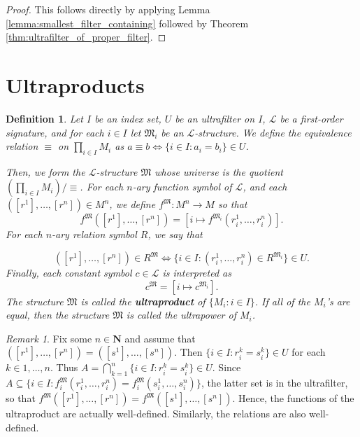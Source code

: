 \documentclass[leqno]{article}
\newtheorem{definition}{Definition}[section]
\theoremstyle{remark}
\newtheorem{remark}{Remark}[section]
\newcommand{\N}{\mathbf{N}}
\newcommand{\paren}[1]{\left( #1 \right)}
\newcommand{\set}[1]{\{#1\}}
\newcommand{\lang}{\mathcal{L}}
\newcommand{\struct}[1]{\mathfrak{#1}}
\begin{document}
\begin{proof}
    This follows directly by applying Lemma \ref{lemma:smallest_filter_containing} followed by Theorem \ref{thm:ultrafilter_of_proper_filter}.
\end{proof}


\section{Ultraproducts}

\begin{definition}
    Let $I$ be an index set, $U$ be an ultrafilter on $I$, $\lang$ be a first-order signature, and for each $i \in I$ let $\struct{M}_i$ be an $\lang$-structure. We define the equivalence relation $\equiv$ on $\prod_{i \in I} M_i$ as $a \equiv b \iff \set{i \in I : a_i = b_i} \in U$.
    
    Then, we form the $\lang$-structure $\struct{M}$ whose universe is the quotient $\paren{\prod_{i \in I} M_i} / \equiv$. For each $n$-ary function symbol of $\lang$, and each $([r^1], \dots, [r^n]) \in M^n$, we define $f^\struct{M} : M^n \to M$ so that
    $$f^\struct{M}([r^1], \dots, [r^n]) = [i \mapsto f^{\struct{M}_i}(r^{1}_i, \dots, r^{n}_i)].$$ For each $n$-ary relation symbol $R$, we say that 
    
    \begin{equation*}
        ([r^1], \dots, [r^n]) \in R^\struct{M} \iff \set{i \in I : (r^1_i, \dots, r^n_i) \in R^{\struct{M}_i}} \in U.
    \end{equation*} Finally, each constant symbol $c \in \lang$ is interpreted as \begin{equation*}
        c^\struct{M} = [i \mapsto c^{\struct{M}_i}].
    \end{equation*} The structure $\struct{M}$ is called the \textbf{ultraproduct} of $\set{M_i : i \in I}$. If all of the $M_i$'s are equal, then the structure $\struct{M}$ is called the ultrapower of $M_i$.
\end{definition}

\begin{remark}
    Fix some $n \in \N$ and assume that $([r^1], \dots, [r^n]) = ([s^1], \dots, [s^n])$. Then $\set{i \in I : r^k_i = s^k_i} \in U$ for each $k \in 1, \dots, n$. Thus $A = \bigcap_{k = 1}^n \set{i \in I : r^k_i = s^k_i} \in U$. Since $A \subseteq \set{i \in I : f^\struct{M}_i(r^1_i, \dots, r^n_i) = f^\struct{M}_i(s^1_i, \dots, s^n_i)}$, the latter set is in the ultrafilter, so that $f^\struct{M}([r^1], \dots, [r^n]) = f^\struct{M}([s^1], \dots, [s^n])$. Hence, the functions of the ultraproduct are actually well-defined. Similarly, the relations are also well-defined.
\end{remark}
\end{document}
